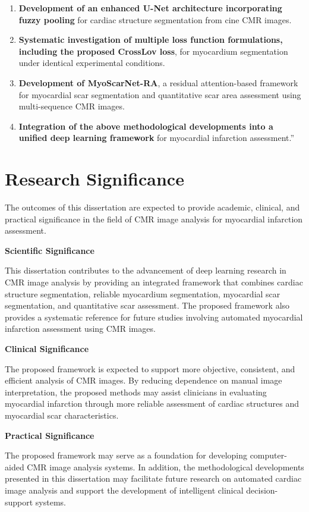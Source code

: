 \begin{enumerate}
	\def\labelenumi{\arabic{enumi}.}
	\item
	\textbf{Development of an enhanced U-Net architecture incorporating
		fuzzy pooling} for cardiac structure segmentation from cine CMR
	images.
	\item
	\textbf{Systematic investigation of multiple loss function
		formulations, including the proposed CrossLov loss}, for myocardium
	segmentation under identical experimental conditions.
	\item
	\textbf{Development of MyoScarNet-RA}, a residual attention-based
	framework for myocardial scar segmentation and quantitative scar area
	assessment using multi-sequence CMR images.
	\item
	\textbf{Integration of the above methodological developments into a
		unified deep learning framework} for myocardial infarction
	assessment.''
\end{enumerate}

\section{Research Significance}
\label{sec:research-significance}

The outcomes of this dissertation are expected to provide academic,
clinical, and practical significance in the field of CMR image analysis
for myocardial infarction assessment.

\textbf{Scientific Significance}

This dissertation contributes to the advancement of deep learning
research in CMR image analysis by providing an integrated framework that
combines cardiac structure segmentation, reliable myocardium
segmentation, myocardial scar segmentation, and quantitative scar
assessment. The proposed framework also provides a systematic reference
for future studies involving automated myocardial infarction assessment
using CMR images.

\textbf{Clinical Significance}

The proposed framework is expected to support more objective,
consistent, and efficient analysis of CMR images. By reducing dependence
on manual image interpretation, the proposed methods may assist
clinicians in evaluating myocardial infarction through more reliable
assessment of cardiac structures and myocardial scar characteristics.

\textbf{Practical Significance}

The proposed framework may serve as a foundation for developing
computer-aided CMR image analysis systems. In addition, the
methodological developments presented in this dissertation may
facilitate future research on automated cardiac image analysis and
support the development of intelligent clinical decision-support
systems.

